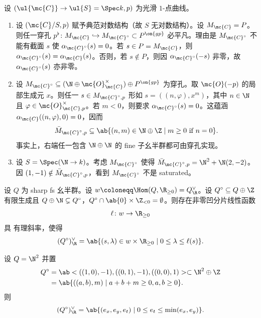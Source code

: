 \begin{exm}
    设 \((\ul{\mc{C}} \to \ul{S} = \Spec k, p)\) 为光滑 \(1\)-点曲线。
    \begin{enumerate}
        \item 设 \((\mc{C}/S, p)\) 赋予典范对数结构（故 \(S\) 无对数结构）。设 \(M_{\mc{C}} = P\)。则任一穿孔 \(p^{\flat} \colon M_{\mc{C}} \hookrightarrow M_{\mc{C}^{\circ}} \subset P^{\on{gp}}\) 必平凡。理由是 \(M_{\mc{C}^{\circ}}\) 不能有截面 \(s\) 使 \(\alpha_{\mc{C}^{\circ}}(s) = 0\)。若 \(s \in P = M_{\mc{C}}\)，则 \(\alpha_{\mc{C}^{\circ}}(s) = \alpha_{\mc{C}}(s)\)。否则，若 \(s \notin P\)，则因 \(\alpha_{\mc{C}^{\circ}}(-s)\) 非零，故 \(\alpha_{\mc{C}^{\circ}}(s)\) 亦非零。
        \item 设 \(M_{\mc{C}^{\circ}} \subseteq (\N \oplus \mc{O}_{\mc{C}}^{\times}) \oplus P^{\on{gp}}\) 为穿孔。取 \(\mc{O}(-p)\) 的局部生成元 \(x\)。则任一 \(s \in M_{\mc{C}^{\circ}, p}\) 形如 \(s = ((n, \varphi), x^m)\)，其中 \(n \in \N\) 且 \(\varphi \in \mc{O}_{\mc{C}, p}^{\times}\)。若 \(m < 0\)，则要求 \(\alpha_{\mc{C}^{\circ}}(s) = 0\)。这蕴涵 \(\alpha_{\mc{C}}((n, \varphi), 0) = 0\)，因而
            \[ \bar{M}_{\mc{C}^{\circ}, p} \subseteq \ab\{(n, m) \in \N \oplus \Z \mid m \geq 0 \text{ if } n = 0 \}. \]
            事实上，右端任一包含 \(\N \oplus \N\) 的 fine 子幺半群都可由穿孔实现。
        \item 设 \(S = \Spec(\N \to k)\)。考虑 \(M_{\mc{C}^{\circ}}\) 使得 \(\bar{M}_{\mc{C}^{\circ}, p} = \N^2 + \N (2,-2)\)。因 \((1,-1) \notin \bar{M}_{\mc{C}^{\circ}, p}\)，看到 \(M_{\mc{C}^{\circ}}\) 不是 saturated。
    \end{enumerate}
\end{exm}

\begin{lem}
    设 \(Q\) 为 sharp fs 幺半群。设 \(w \coloneqq \Hom(Q, \R_{\geq 0}) = Q_{\R}^{\vee}\)。设 \(Q^{\circ} \subseteq Q \oplus \Z\) 有限生成且 \(Q \oplus \N \subsetneq Q^{\circ}\)，\(Q^{\circ} \cap \ab\{0\} \times \Z_{<0} = \emptyset\)。则存在非零凹分片线性函数
    \[ \ell \colon w \to \R_{\geq 0} \]
    具 有理斜率，使得
    \[ (Q^{\circ})_{\R}^{\vee} = \ab\{ (s, \lambda) \in w \times \R_{\geq 0} \mid 0 \leq \lambda \leq \ell(s) \}. \]
\end{lem}

\begin{exm}
    设 \(Q = \N^2\) 并置
    \begin{align*}
        Q^{\circ} &= \ab<((1,0), -1), ((0,1), -1), ((0,0),1)> \subset \N^2 \oplus \Z \\
        &= \ab\{((a,b), m) \mid a+b+m \geq 0, a,b \geq 0 \}.
    \end{align*}
    则
    \[ (Q^{\circ})_{\R}^{\vee} = \ab\{ (e_x, e_y, e_t) \mid 0 \leq e_t \leq \min(e_x, e_y) \}. \]
\end{exm}
